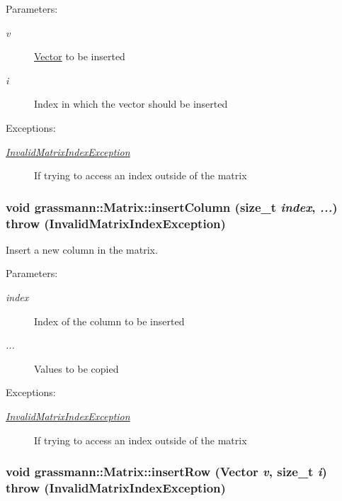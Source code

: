 \begin{Desc}
\item[Parameters:]
\begin{description}
\item[{\em v}]\hyperlink{classgrassmann_1_1Vector}{Vector} to be inserted \item[{\em i}]Index in which the vector should be inserted \end{description}
\end{Desc}
\begin{Desc}
\item[Exceptions:]
\begin{description}
\item[{\em \hyperlink{classgrassmann_1_1InvalidMatrixIndexException}{InvalidMatrixIndexException}}]If trying to access an index outside of the matrix \end{description}
\end{Desc}
\hypertarget{classgrassmann_1_1Matrix_1759617e41816a26dcb1ba761058662c}{
\subsubsection[insertColumn]{\setlength{\rightskip}{0pt plus 5cm}void grassmann::Matrix::insertColumn (size\_\-t {\em index}, \/   {\em ...})  throw ({\bf InvalidMatrixIndexException})}}
\label{classgrassmann_1_1Matrix_1759617e41816a26dcb1ba761058662c}


Insert a new column in the matrix. 

\begin{Desc}
\item[Parameters:]
\begin{description}
\item[{\em index}]Index of the column to be inserted \item[{\em ...}]Values to be copied \end{description}
\end{Desc}
\begin{Desc}
\item[Exceptions:]
\begin{description}
\item[{\em \hyperlink{classgrassmann_1_1InvalidMatrixIndexException}{InvalidMatrixIndexException}}]If trying to access an index outside of the matrix \end{description}
\end{Desc}
\hypertarget{classgrassmann_1_1Matrix_11d05c397236b6186a6c99b41141049b}{
\subsubsection[insertRow]{\setlength{\rightskip}{0pt plus 5cm}void grassmann::Matrix::insertRow ({\bf Vector} {\em v}, \/  size\_\-t {\em i})  throw ({\bf InvalidMatrixIndexException})}}
\label{classgrassmann_1_1Matrix_11d05c397236b6186a6c99b41141049b}


